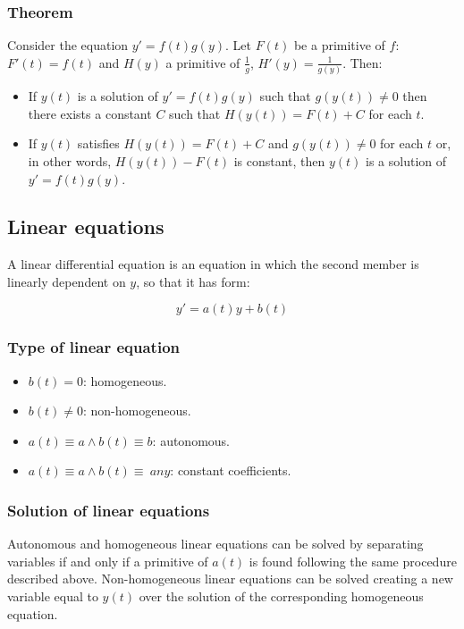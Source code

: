 		\subsubsection{Theorem}
		Consider the equation $y' = f(t)g(y)$.
		Let $F(t)$ be a primitive of $f$: $F'(t) = f(t)$ and $H(y)$ a primitive of $\frac{1}{g}$, $H'(y) = \frac{1}{g(y)}$.
		Then:

		\begin{multicols}{2}
			\begin{itemize}
				\item If $y(t)$ is a solution of $y' = f(t)g(y)$ such that $g(y(t))\neq 0$ then there exists a constant $C$ such that $H(y(t)) = F(t) + C$ for each $t$.
				\item If $y(t)$ satisfies $H(y(t)) = F(t) + C$ and $g(y(t)) \neq 0$ for each $t$ or, in other words, $H(y(t))-F(t)$ is constant, then $y(t)$ is a solution of $y' = f(t)g(y)$.
			\end{itemize}
		\end{multicols}

	\subsection{Linear equations}
	A linear differential equation is an equation in which the second member is linearly dependent on $y$, so that it has form:

	$$y' = a(t)y + b(t)$$

		\subsubsection{Type of linear equation}

		\begin{multicols}{2}
			\begin{itemize}
				\item $b(t) = 0$: homogeneous.
				\item $b(t)\neq 0$: non-homogeneous.
				\item $a(t)\equiv a\land b(t)\equiv b$: autonomous.
				\item $a(t)\equiv a\land b(t)\equiv\ any$: constant coefficients.
			\end{itemize}
		\end{multicols}

		\subsubsection{Solution of linear equations}
		Autonomous and homogeneous linear equations can be solved by separating variables if and only if a primitive of $a(t)$ is found following the same procedure described above.
		Non-homogeneous linear equations can be solved creating a new variable equal to $y(t)$ over the solution of the corresponding homogeneous equation.

